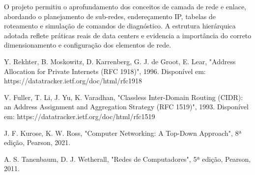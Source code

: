 \documentclass[conference,compsoc]{IEEEtran}
\begin{document}
\begin{otherlanguage}{brazil}
O projeto permitiu o aprofundamento dos conceitos de camada de rede e enlace, abordando o planejamento de sub-redes, endereçamento IP, tabelas de roteamento e simulação de comandos de diagnóstico. A estrutura hierárquica adotada reflete práticas reais de data centers e evidencia a importância do correto dimensionamento e configuração dos elementos de rede.



%
%
%
\begin{thebibliography}{9}

Y. Rekhter, B. Moskowitz, D. Karrenberg, G. J. de Groot, E. Lear, "Address Allocation for Private Internets (RFC 1918)", 1996. Disponível em: https://datatracker.ietf.org/doc/html/rfc1918

V. Fuller, T. Li, J. Yu, K. Varadhan, "Classless Inter-Domain Routing (CIDR): an Address Assignment and Aggregation Strategy (RFC 1519)", 1993. Disponível em: https://datatracker.ietf.org/doc/html/rfc1519

J. F. Kurose, K. W. Ross, "Computer Networking: A Top-Down Approach", 8ª edição, Pearson, 2021.

A. S. Tanenbaum, D. J. Wetherall, "Redes de Computadores", 5ª edição, Pearson, 2011.

\end{thebibliography}
\end{otherlanguage}
\end{document}
